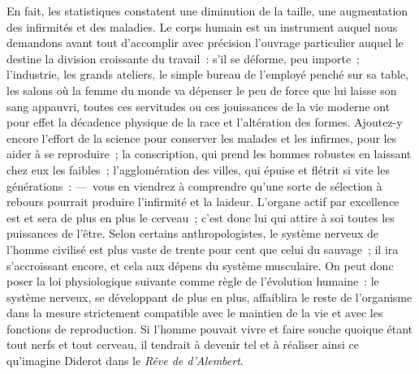 \documentclass[french,twoside]{book} %
\begin{document}
En fait, les statistiques constatent une diminution de la taille, une augmentation des infirmités et des maladies. Le corps humain est un instrument auquel nous demandons avant tout d’accomplir avec précision l’ouvrage particulier auquel le destine la division croissante du travail : s’il se déforme, peu importe ; l’industrie, les grands ateliers, le simple bureau de l’employé penché sur sa table, les salons où la femme du monde va dépenser le peu de force que lui laisse son sang appauvri, toutes ces servitudes ou ces jouissances de la vie moderne ont pour effet la décadence physique de la race et l’altération des formes. Ajoutez-y encore l’effort de la science pour conserver les malades et les infirmes, pour les aider à se reproduire ; la conscription, qui prend les hommes robustes en laissant chez eux les faibles ; l’agglomération des villes, qui épuise et flétrit si vite les générations : — vous en viendrez à comprendre qu’une sorte de sélection à rebours pourrait produire l’infirmité et la laideur. L’organe actif par excellence est et sera de plus en plus le cerveau ; c’est donc lui qui attire à soi toutes les puissances de l’être. Selon certains anthropologistes, le système nerveux de l’homme civilisé est plus vaste de trente pour cent que celui du sauvage ; il ira s’accroissant encore, et cela aux dépens du système musculaire. On peut donc poser la loi physiologique suivante  comme règle de l’évolution humaine : le système nerveux, se développant de plus en plus, affaiblira le reste de l’organisme dans la mesure strictement compatible avec le maintien de la vie et avec les fonctions de reproduction. Si l’homme pouvait vivre et faire souche quoique étant tout nerfs et tout cerveau, il tendrait à devenir tel et à réaliser ainsi ce qu’imagine Diderot dans le \emph{Rêve de d’Alembert}.\par
\end{document}
